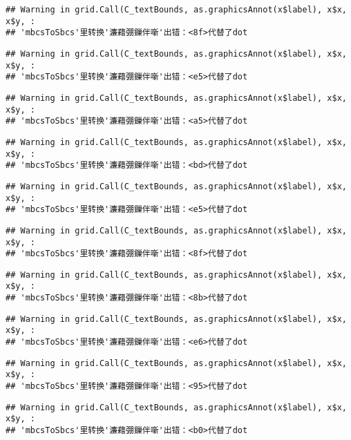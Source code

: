 \documentclass[]{article}
\begin{document}
\begin{verbatim}
## Warning in grid.Call(C_textBounds, as.graphicsAnnot(x$label), x$x, x$y, :
## 'mbcsToSbcs'里转换'濂藉弸鏁伴噺'出错：<8f>代替了dot
\end{verbatim}

\begin{verbatim}
## Warning in grid.Call(C_textBounds, as.graphicsAnnot(x$label), x$x, x$y, :
## 'mbcsToSbcs'里转换'濂藉弸鏁伴噺'出错：<e5>代替了dot
\end{verbatim}

\begin{verbatim}
## Warning in grid.Call(C_textBounds, as.graphicsAnnot(x$label), x$x, x$y, :
## 'mbcsToSbcs'里转换'濂藉弸鏁伴噺'出错：<a5>代替了dot
\end{verbatim}

\begin{verbatim}
## Warning in grid.Call(C_textBounds, as.graphicsAnnot(x$label), x$x, x$y, :
## 'mbcsToSbcs'里转换'濂藉弸鏁伴噺'出错：<bd>代替了dot
\end{verbatim}

\begin{verbatim}
## Warning in grid.Call(C_textBounds, as.graphicsAnnot(x$label), x$x, x$y, :
## 'mbcsToSbcs'里转换'濂藉弸鏁伴噺'出错：<e5>代替了dot
\end{verbatim}

\begin{verbatim}
## Warning in grid.Call(C_textBounds, as.graphicsAnnot(x$label), x$x, x$y, :
## 'mbcsToSbcs'里转换'濂藉弸鏁伴噺'出错：<8f>代替了dot
\end{verbatim}

\begin{verbatim}
## Warning in grid.Call(C_textBounds, as.graphicsAnnot(x$label), x$x, x$y, :
## 'mbcsToSbcs'里转换'濂藉弸鏁伴噺'出错：<8b>代替了dot
\end{verbatim}

\begin{verbatim}
## Warning in grid.Call(C_textBounds, as.graphicsAnnot(x$label), x$x, x$y, :
## 'mbcsToSbcs'里转换'濂藉弸鏁伴噺'出错：<e6>代替了dot
\end{verbatim}

\begin{verbatim}
## Warning in grid.Call(C_textBounds, as.graphicsAnnot(x$label), x$x, x$y, :
## 'mbcsToSbcs'里转换'濂藉弸鏁伴噺'出错：<95>代替了dot
\end{verbatim}

\begin{verbatim}
## Warning in grid.Call(C_textBounds, as.graphicsAnnot(x$label), x$x, x$y, :
## 'mbcsToSbcs'里转换'濂藉弸鏁伴噺'出错：<b0>代替了dot
\end{verbatim}
\end{document}
